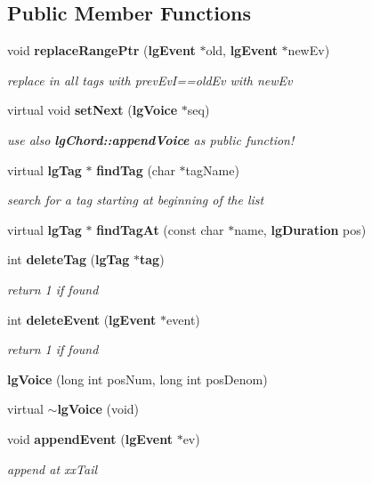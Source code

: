 \subsection*{Public Member Functions}
\begin{CompactItemize}
\item 
void {\bf replace\-Range\-Ptr} ({\bf lg\-Event} $\ast$old, {\bf lg\-Event} $\ast$new\-Ev)
\begin{CompactList}\small\item\em replace in all tags with prev\-Ev\-I==old\-Ev with new\-Ev \item\end{CompactList}\item 
virtual void {\bf set\-Next} ({\bf lg\-Voice} $\ast$seq)
\begin{CompactList}\small\item\em use also {\bf lg\-Chord::append\-Voice} as public function! \item\end{CompactList}\item 
virtual {\bf lg\-Tag} $\ast$ {\bf find\-Tag} (char $\ast$tag\-Name)
\begin{CompactList}\small\item\em search for a tag starting at beginning of the list \item\end{CompactList}\item 
virtual {\bf lg\-Tag} $\ast$ {\bf find\-Tag\-At} (const char $\ast$name, {\bf lg\-Duration} pos)
\item 
int {\bf delete\-Tag} ({\bf lg\-Tag} $\ast${\bf tag})
\begin{CompactList}\small\item\em return 1 if found \item\end{CompactList}\item 
int {\bf delete\-Event} ({\bf lg\-Event} $\ast$event)
\begin{CompactList}\small\item\em return 1 if found \item\end{CompactList}\item 
{\bf lg\-Voice} (long int pos\-Num, long int pos\-Denom)
\item 
virtual {\bf $\sim$lg\-Voice} (void)
\item 
void {\bf append\-Event} ({\bf lg\-Event} $\ast$ev)
\begin{CompactList}\small\item\em append at xx\-Tail \item\end{CompactList}\item 

\end{CompactItemize}

